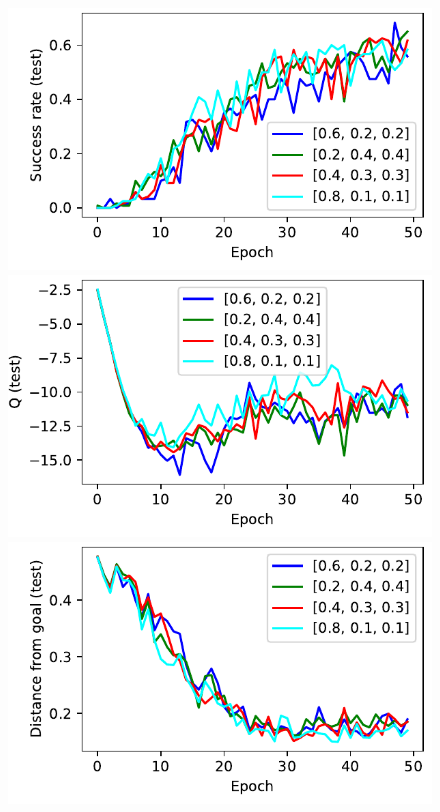 %
\begin{figure}%
  \def\frac{0.24}
  \includegraphics[width=\frac\columnwidth]{./media/res/04a8fc6-814a3d24-FetchSlide-v1-fwrl-future/test/success_rate.pdf}%
  \includegraphics[width=\frac\columnwidth]{./media/res/04a8fc6-814a3d24-FetchSlide-v1-fwrl-future/test/mean_Q.pdf}%
  \includegraphics[width=\frac\columnwidth]{./media/res/04a8fc6-814a3d24-FetchSlide-v1-fwrl-future/test/ag_g_dist.pdf}%

\end{figure}
